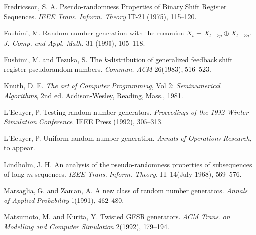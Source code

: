 \begin{thebibliography}{99}




Fredricsson, S. A.
Pseudo-randomness Properties of Binary Shift Register Sequences.
{\em IEEE Trans. Inform. Theory} IT-21 (1975), 115--120.


Fushimi, M. 
Random number generation with the recursion 
$X_t=X_{t-3p}\oplus X_{t-3q}$.
{\em J. Comp. and Appl. Math.} 31 (1990), 105--118.

Fushimi, M. and Tezuka, S. 
The $k$-distribution of generalized feedback shift register pseudorandom
numbers.
{\em Commun. ACM} {\rm 26}(1983), 516--523.

Knuth, D. E. {\em The art of Computer Programming},
Vol 2: {\em Seminumerical Algorithms}, 2nd ed.
Addison-Wesley, Reading, Mass., 1981.


L'Ecuyer, P.
Testing random number generators.
{\em Proceedings of the 1992 Winter Simulation Conference},
IEEE Press (1992), 305--313.

L'Ecuyer, P.
Uniform random number generation.
{\em Annals of Operations Research},
to appear.

Lindholm, J. H. An analysis of the pseudo-randomness properties
of subsequences of long $m$-sequences.
{\em IEEE Trans. Inform. Theory}, IT-14(July 1968), 569--576.

Marsaglia, G. and Zaman, A.
A new class of random number generators.
{\em Annals of Applied Probability} {\rm 1}(1991), 462--480.

Matsumoto, M. and Kurita, Y. 
Twisted GFSR generators.
{\em ACM Trans. on Modelling and Computer Simulation} {\rm 2}(1992), 179--194. 



\end{thebibliography}
